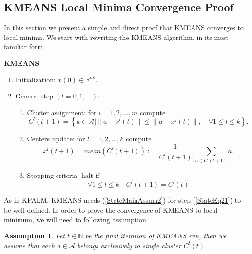 \documentclass[11pt]{article}
\numberwithin{equation}{section}
\newtheorem{assumption}{Assumption}
\begin{document}
\newpage

\subsection{KMEANS Local Minima Convergence Proof}

In this section we present a simple and direct proof that KMEANS converges to local minima. We start with rewriting the KMEANS algorithm, in its most familiar form
\begin{framed}
\noindent \textbf{KMEANS}
\begin{enumerate}[(1)]
	\item Initialization: $x(0) \in \mathbb{R}^{nk}$.
	\item General step $\left( t=0,1, \ldots \right)$:
	\begin{enumerate}[(2.1)]
		\item Cluster assignment: for $i=1, 2, \ldots ,m$ compute
		\begin{equation}
			C^l(t+1) = \left\lbrace a \in \mathcal{A} \mid \| a - x^l(t) \| \leq \|a - x^j(t) \|, \quad \forall 1 \leq l \leq k \right\rbrace . \label{StateEq20}
		\end{equation}
		\item Centers update: for $l=1, 2, \ldots ,k$ compute
		\begin{equation}
			x^l(t+1) = mean(C^l(t+1)) := \frac{1}{\left| C^l(t+1) \right|} \sum\limits_{a \in C^l(t+1)} a . \label{StateEq21}
		\end{equation}
		\item Stopping criteria: halt if 
		\begin{equation}
			\forall 1 \leq l \leq k \quad C^l(t+1)=C^l(t) \label{StateEq22}
		\end{equation}
	\end{enumerate}
\end{enumerate}
\end{framed}

As in KPALM, KMEANS needs (\ref{StateMainAssum2}) for step (\ref{StateEq21}) to be well defined. In order to prove the convergence of KMEANS to local minimum, we will need to following assumption.

\begin{assumption} \label{StateEq23}
Let $t \in \mathbb{N}$ be the final iteration of KMEANS run, then we assume that each $a \in \mathcal{A}$ belongs exclusively to single cluster $C^l(t)$.
\end{assumption}
\end{document}
